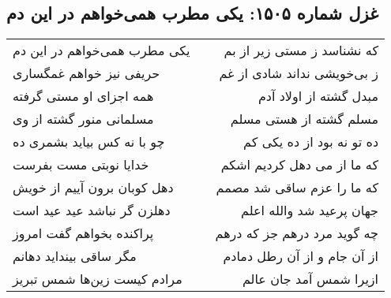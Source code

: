 \begin{center}
\section*{غزل شماره ۱۵۰۵: یکی مطرب همی‌خواهم در این دم}
\label{sec:1505}
\begin{longtable}{l p{0.5cm} r}
یکی مطرب همی‌خواهم در این دم
&&
که نشناسد ز مستی زیر از بم
\\
حریفی نیز خواهم غمگساری
&&
ز بی‌خویشی نداند شادی از غم
\\
همه اجزای او مستی گرفته
&&
مبدل گشته از اولاد آدم
\\
مسلمانی منور گشته از وی
&&
مسلم گشته از هستی مسلم
\\
چو با نه کس بیاید بشمری ده
&&
ده تو نه بود از ده یکی کم
\\
خدایا نوبتی مست بفرست
&&
که ما از می دهل کردیم اشکم
\\
دهل کوبان برون آییم از خویش
&&
که ما را عزم ساقی شد مصمم
\\
دهلزن گر نباشد عید عید است
&&
جهان پرعید شد والله اعلم
\\
پراکنده بخواهم گفت امروز
&&
چه گوید مرد درهم جز که درهم
\\
مگر ساقی بینداید دهانم
&&
از آن جام و از آن رطل دمادم
\\
مرادم کیست زین‌ها شمس تبریز
&&
ازیرا شمس آمد جان عالم
\\
\end{longtable}
\end{center}
